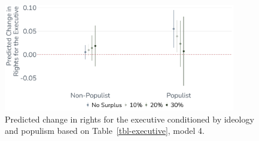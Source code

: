 \documentclass[
  abstract]{article}
\begin{document}
\begin{figure}[H]

{\centering \includegraphics[width=0.9\textwidth,height=\textheight]{results/graphs/change_in_executive.pdf}

}

\caption{\label{fig-executive}Predicted change in rights for the
executive conditioned by ideology and populism based on
Table~\ref{tbl-executive}, model 4.}

\end{figure}

\blandscape
\renewcommand{\arraystretch}{0.5}
\setlength{\tabcolsep}{2pt}
\end{document}
